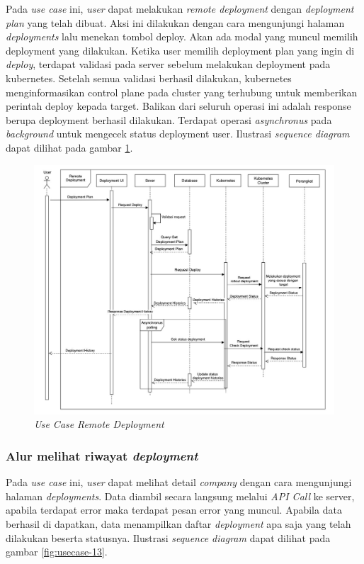 Pada \textit{use case} ini, \textit{user} dapat melakukan \textit{remote deployment} dengan \textit{deployment plan} yang telah dibuat. Aksi ini dilakukan dengan cara mengunjungi halaman \textit{deployments} lalu menekan tombol deploy. Akan ada modal yang muncul memilih deployment yang dilakukan. Ketika user memilih deployment plan yang ingin di \textit{deploy}, terdapat validasi pada server sebelum melakukan deployment pada kubernetes. Setelah semua validasi berhasil dilakukan, kubernetes menginformasikan control plane pada cluster yang terhubung untuk memberikan perintah deploy kepada target. Balikan dari seluruh operasi ini adalah response berupa deployment berhasil dilakukan. Terdapat operasi \textit{asynchronus} pada \textit{background} untuk mengecek status deployment user. Ilustrasi \textit{sequence diagram} dapat dilihat pada gambar \ref{fig:usecase-12}.

\begin{figure}[ht]
  \centering
  \includegraphics[width=1\textwidth]{resources/chapter-3/usecase/uc-12.jpg}
  \caption{\textit{Use Case} \textit{Remote Deployment}}
  \label{fig:usecase-12}
\end{figure}

\pagebreak

\subsubsection{Alur melihat riwayat \textit{deployment}}

Pada \textit{use case} ini, \textit{user} dapat melihat detail \textit{company} dengan cara mengunjungi halaman \textit{deployments}. Data diambil secara langsung melalui \textit{API Call} ke server, apabila terdapat error maka terdapat pesan error yang muncul. Apabila data berhasil di dapatkan, data menampilkan daftar \textit{deployment} apa saja yang telah dilakukan beserta statusnya. Ilustrasi \textit{sequence diagram} dapat dilihat pada gambar \ref{fig:usecase-13}.

